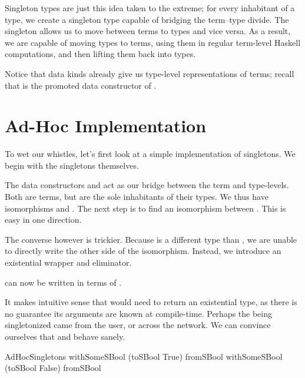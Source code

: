 \documentclass[book.tex]{subfiles}
\begin{document}
Singleton types are just this idea taken to the extreme; for every inhabitant of
a type, we create a singleton type capable of bridging the term--type divide. The
singleton allows us to move between terms to types and vice versa. As a result,
we are capable of moving types to terms, using them in regular term-level
Haskell computations, and then lifting them back into types.

Notice that data kinds already give us type-level representations of terms;
recall that  is the \gls{promoted data constructor} of .


\section{Ad-Hoc Implementation}


To wet our whistles, let's first look at a simple implementation of singletons.
We begin with the singletons themselves.


The data constructors  and  act as our bridge between the
term and type-levels. Both are terms, but are the sole inhabitants of their
types. We thus have isomorphisms  and .
The next step is to find an isomorphism between . This is
easy in one direction.


The converse however is trickier. Because  is a different type
than , we are unable to directly write the other side of the
isomorphism. Instead, we introduce an existential wrapper  and
eliminator.


 can now be written in terms of .


It makes intuitive sense that  would need to return an existential
type, as there is no guarantee its arguments are known at compile-time. Perhaps
the  being singletonized came from the user, or across the network. We
can convince ourselves that  and  behave sanely.

\begin{dorepl}{AdHocSingletons}
withSomeSBool (toSBool True)  fromSBool
withSomeSBool (toSBool False) fromSBool
\end{dorepl}
\end{document}
